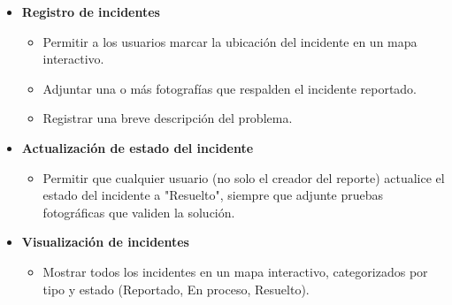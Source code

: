 \begin{itemize}
    \item \textbf{Registro de incidentes}
    \begin{itemize}
        \item Permitir a los usuarios marcar la ubicación del incidente en un mapa interactivo.
        \item Adjuntar una o más fotografías que respalden el incidente reportado.
        \item Registrar una breve descripción del problema.
    \end{itemize}
    \item \textbf{Actualización de estado del incidente}
    \begin{itemize}
        \item Permitir que cualquier usuario (no solo el creador del reporte) actualice el estado del incidente a "Resuelto", siempre que adjunte pruebas fotográficas que validen la solución.
    \end{itemize}
    \item \textbf{Visualización de incidentes}
    \begin{itemize}
        \item Mostrar todos los incidentes en un mapa interactivo, categorizados por tipo y estado (Reportado, En proceso, Resuelto).
    \end{itemize}
\end{itemize}
